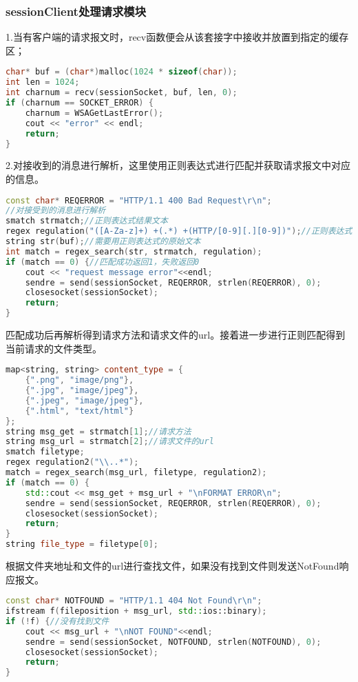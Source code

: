 \subsubsection{sessionClient处理请求模块}
\hspace*{2em}1.当有客户端的请求报文时，recv函数便会从该套接字中接收并放置到指定的缓存区；
\begin{lstlisting}[language=c++]
char* buf = (char*)malloc(1024 * sizeof(char));
int len = 1024;
int charnum = recv(sessionSocket, buf, len, 0);
if (charnum == SOCKET_ERROR) {
	charnum = WSAGetLastError();
	cout << "error" << endl;
	return;
}
\end{lstlisting}
\hspace*{2em}2.对接收到的消息进行解析，这里使用正则表达式进行匹配并获取请求报文中对应的信息。
\begin{lstlisting}[language=c++]
const char* REQERROR = "HTTP/1.1 400 Bad Request\r\n";
//对接受到的消息进行解析
smatch strmatch;//正则表达式结果文本
regex regulation("([A-Za-z]+) +(.*) +(HTTP/[0-9][.][0-9])");//正则表达式规则
string str(buf);//需要用正则表达式的原始文本
int match = regex_search(str, strmatch, regulation);
if (match == 0) {//匹配成功返回1，失败返回0
	cout << "request message error"<<endl;
	sendre = send(sessionSocket, REQERROR, strlen(REQERROR), 0);
	closesocket(sessionSocket);
	return;
}
\end{lstlisting}
\hspace*{2em}匹配成功后再解析得到请求方法和请求文件的url。接着进一步进行正则匹配得到当前请求的文件类型。
\begin{lstlisting}[language=c++]
map<string, string> content_type = {
	{".png", "image/png"},
	{".jpg", "image/jpeg"},
	{".jpeg", "image/jpeg"},
	{".html", "text/html"}
};
string msg_get = strmatch[1];//请求方法
string msg_url = strmatch[2];//请求文件的url
smatch filetype;
regex regulation2("\\..*");
match = regex_search(msg_url, filetype, regulation2);
if (match == 0) {
	std::cout << msg_get + msg_url + "\nFORMAT ERROR\n";
	sendre = send(sessionSocket, REQERROR, strlen(REQERROR), 0);
	closesocket(sessionSocket);
	return;
}
string file_type = filetype[0];
\end{lstlisting}
\hspace*{2em}根据文件夹地址和文件的url进行查找文件，如果没有找到文件则发送NotFound响应报文。
\begin{lstlisting}[language=c++]
const char* NOTFOUND = "HTTP/1.1 404 Not Found\r\n";
ifstream f(fileposition + msg_url, std::ios::binary);
if (!f) {//没有找到文件
	cout << msg_url + "\nNOT FOUND"<<endl;
	sendre = send(sessionSocket, NOTFOUND, strlen(NOTFOUND), 0);
	closesocket(sessionSocket);
	return;
}
\end{lstlisting}
